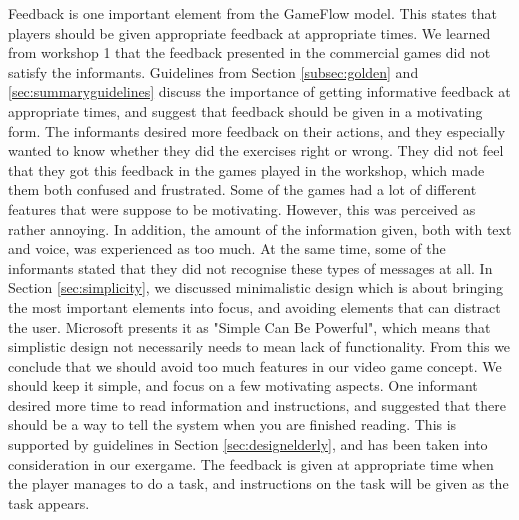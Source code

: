 Feedback is one important element from the GameFlow model. This states that players should be given appropriate feedback at appropriate times. We learned from workshop 1 that the feedback presented in the commercial games did not satisfy the informants. Guidelines from Section \ref{subsec:golden} and \ref{sec:summaryguidelines} discuss the importance of getting informative feedback at appropriate times, and suggest that feedback should be given in a motivating form. The informants desired more feedback on their actions, and they especially wanted to know whether they did the exercises right or wrong. They did not feel that they got this feedback in the games played in the workshop, which made them both confused and frustrated. Some of the games had a lot of different features that were suppose to be motivating. However, this was perceived as rather annoying. In addition, the amount of the information given, both with text and voice, was experienced as too much. At the same time, some of the informants stated that they did not recognise these types of messages at all. In Section \ref{sec:simplicity}, we discussed minimalistic design which is about bringing the most important elements into focus, and avoiding elements that can distract the user. Microsoft presents it as "Simple Can Be Powerful", which means that simplistic design not necessarily needs to mean lack of functionality. From this we conclude that we should avoid too much features in our video game concept. We should keep it simple, and focus on a few motivating aspects. One informant desired more time to read information and instructions, and suggested that there should be a way to tell the system when you are finished reading. This is supported by guidelines in Section \ref{sec:designelderly}, and has been taken into consideration in our exergame. The feedback is given at appropriate time when the player manages to do a task, and instructions on the task will be given as the task appears.

